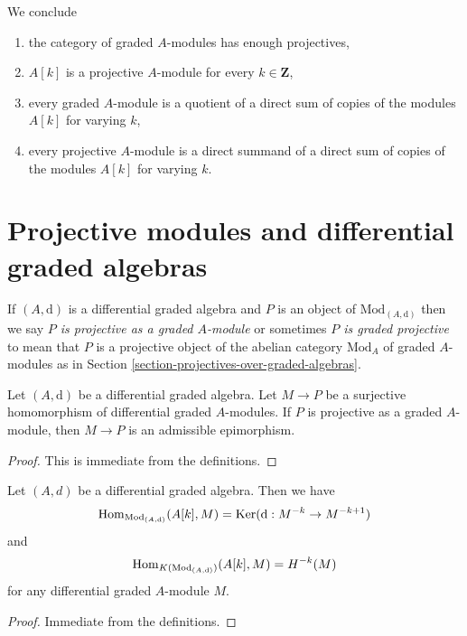 \medskip\noindent
We conclude
\begin{enumerate}
\item the category of graded $A$-modules has enough projectives,
\item $A[k]$ is a projective $A$-module for every $k \in \mathbf{Z}$,
\item every graded $A$-module is a quotient of a direct sum of
copies of the modules $A[k]$ for varying $k$,
\item every projective $A$-module is a direct summand of a direct
sum of copies of the modules $A[k]$ for varying $k$.
\end{enumerate}




\section{Projective modules and differential graded algebras}
\label{section-projective-over-differential-graded}

\noindent
If $(A, \text{d})$ is a differential graded algebra and $P$ is
an object of $\text{Mod}_{(A, \text{d})}$ then we say
{\it $P$ is projective as a graded $A$-module} or sometimes
{\it $P$ is graded projective} to mean that $P$
is a projective object of the abelian category $\text{Mod}_A$
of graded $A$-modules as in
Section \ref{section-projectives-over-graded-algebras}.

\begin{lemma}
\label{lemma-target-graded-projective}
Let $(A, \text{d})$ be a differential graded algebra.
Let $M \to P$ be a surjective homomorphism of differential graded
$A$-modules. If $P$ is projective as a graded $A$-module, then
$M \to P$ is an admissible epimorphism.
\end{lemma}

\begin{proof}
This is immediate from the definitions.
\end{proof}

\begin{lemma}
\label{lemma-hom-from-shift-free}
Let $(A, d)$ be a differential graded algebra. Then we have
$$
\mathop{\mathrm{Hom}}\nolimits_{\text{Mod}_{(A, \text{d})}}(A[k], M) =
\mathop{\mathrm{Ker}}(\text{d} : M^{-k} \to M^{-k + 1})
$$
and
$$
\mathop{\mathrm{Hom}}\nolimits_{K(\text{Mod}_{(A, \text{d})})}(A[k], M) = H^{-k}(M)
$$
for any differential graded $A$-module $M$.
\end{lemma}

\begin{proof}
Immediate from the definitions.
\end{proof}







